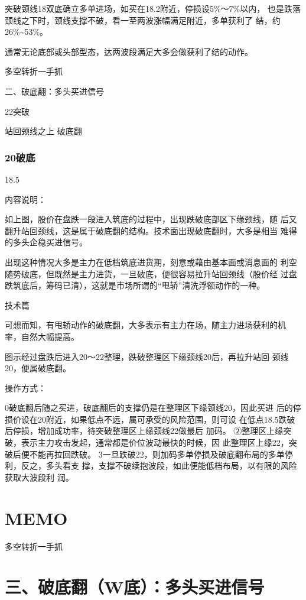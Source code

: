 \documentclass{article}
\begin{document}
突破颈线18双底确立多单进场，如买在18.2附近，停损设5\%～7\%以内， 也是跌落颈线之下时，颈线支撑不破，看一至两波涨幅满足附近，多单获利了 结，约26\%\textasciitilde{}53\%。

通常无论底部或头部型态，达两波段满足大多会做获利了结的动作。

\clearpage

多空转折一手抓

二、破底翻：多头买进信号

22突破

站回颈线之上 破底翻

\subsubsection{20破底}

18.5

内容说明：

如上图，股价在盘跌一段进入筑底的过程中，出现跌破底部区下缘颈线，随 后又翻升站回颈线，这是属于破底翻的结构。技术面出现破底翻时，大多是相当 难得的多头企稳买进信号。

出现这种情况大多是主力在低档筑底进货期，刻意或藉由基本面或消息面的 利空随势破底，但既然是主力进货，一旦破底，便很容易拉升站回颈线（股价经 过盘跌筑底后，筹码已清），这就是市场所谓的“甩轿”清洗浮额动作的一种。

\clearpage

技术篇

可想而知，有甩轿动作的破底翻，大多表示有主力在场，随主力进场获利的机 率，自然大幅提高。

图示经过盘跌后进入20～22整理，跌破整理区下缘颈线20后，再拉升站回 颈线20，便属破底翻。

操作方式：

0破底翻后随之买进，破底翻后的支撑仍是在整理区下缘颈线20，因此买进 后的停损价设在20附近，如果低点不远，属可承受的风险范围，则可设 在低点18.5跌破后停损，增加成功率，待突破整理区上缘颈线22做最后 加码。 ②整理区上缘突破，表示主力攻击发起，通常都是价位波动最快的时候，因 此整理区上缘22，突破后便不能再拉回跌破。 3一旦跌破22，则加码多单停损及破底翻布局的多单停利，反之，多头看支 撑，支撑不破续抱波段，如此便能低档布局，以有限的风险获取大波段利 润。

\section{MEMO}

\clearpage

多空转折一手抓

\section{三、破底翻（W底）：多头买进信号}
\end{document}
